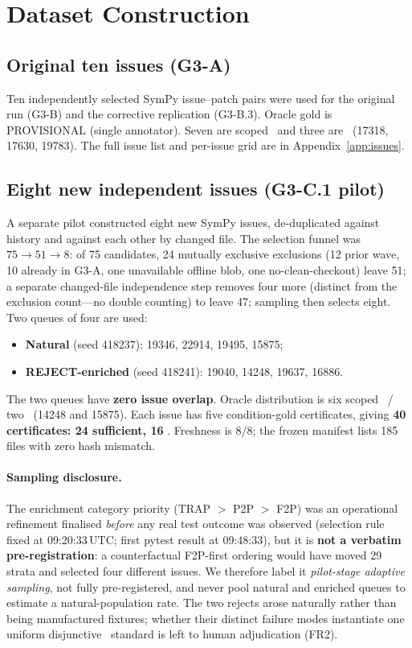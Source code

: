 \section{Dataset Construction}
\label{sec:dataset}

\subsection{Original ten issues (G3-A)}
Ten independently selected SymPy issue--patch pairs were used for the original
run (G3-B) and the corrective replication (G3-B.3). Oracle gold is
PROVISIONAL (single annotator). Seven are scoped \ACCEPT\ and three are
\REJECT\ (17318, 17630, 19783). The full issue list and per-issue grid are in
Appendix~\ref{app:issues}.

\subsection{Eight new independent issues (G3-C.1 pilot)}
A separate pilot constructed eight new SymPy issues, de-duplicated against
history and against each other by changed file. The selection funnel was
$75\rightarrow51\rightarrow8$: of 75 candidates, 24 mutually exclusive
exclusions (12 prior wave, 10 already in G3-A, one unavailable offline blob,
one no-clean-checkout) leave 51; a separate changed-file independence step
removes four more (distinct from the exclusion count---no double counting) to
leave 47; sampling then selects eight. Two queues of four are used:
\begin{itemize}[leftmargin=1.6em,itemsep=1pt,topsep=2pt]
  \item \textbf{Natural} (seed 418237): 19346, 22914, 19495, 15875;
  \item \textbf{REJECT-enriched} (seed 418241): 19040, 14248, 19637, 16886.
\end{itemize}
The two queues have \textbf{zero issue overlap}. Oracle distribution is six
scoped \ACCEPT\ / two \REJECT\ (14248 and 15875). Each issue has five
condition-gold certificates, giving \textbf{40 certificates: 24 sufficient, 16
\NEED}. Freshness is $8/8$; the frozen manifest lists 185 files with zero hash
mismatch.

\paragraph{Sampling disclosure.}
The enrichment category priority (TRAP $>$ P2P $>$ F2P) was an operational
refinement finalised \emph{before} any real test outcome was observed (selection
rule fixed at 09:20:33\,UTC; first pytest result at 09:48:33), but it is
\textbf{not a verbatim pre-registration}: a counterfactual F2P-first ordering
would have moved 29 strata and selected four different issues. We therefore
label it \emph{pilot-stage adaptive sampling}, not fully pre-registered, and
never pool natural and enriched queues to estimate a natural-population rate.
The two rejects arose naturally rather than being manufactured fixtures;
whether their distinct failure modes instantiate one uniform disjunctive
\REJECT\ standard is left to human adjudication (FR2).

